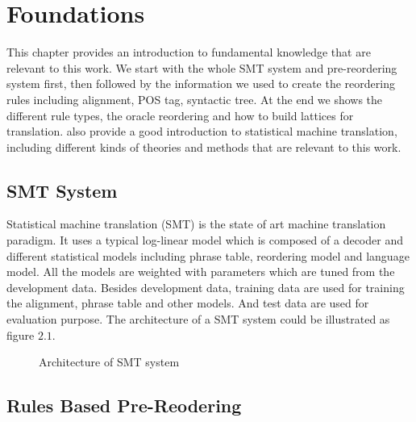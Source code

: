 
\chapter{Foundations}
\label{ch:Foundations}

This chapter provides an introduction to fundamental knowledge that are relevant to this work. We start with the whole SMT system and pre-reordering system first, then followed by the information we used to create the reordering rules including alignment, POS tag, syntactic tree. At the end we shows the different rule types, the oracle reordering and how to build lattices for translation. \cite{book} also provide a good introduction to statistical machine translation, including different kinds of theories and methods that are relevant to this work.

\section{SMT System}
\label{ch:Foundations:sec:SMTSystem}


Statistical machine translation (SMT) is the state of art machine translation paradigm. It uses a typical log-linear model which is composed of a decoder and different statistical models including phrase table, reordering model and language model. All the models are weighted with parameters which are tuned from the development data. Besides development data, training data are used for training the alignment, phrase table and other models. And test data are used for evaluation purpose. The architecture of a SMT system could be illustrated as figure $2.1$.

\begin{figure}[H]
\centering

\caption{Architecture of SMT system}
\end{figure}

\section{Rules Based Pre-Reodering}
\label{ch:Foundations:sec:PreReorderingSystem}

